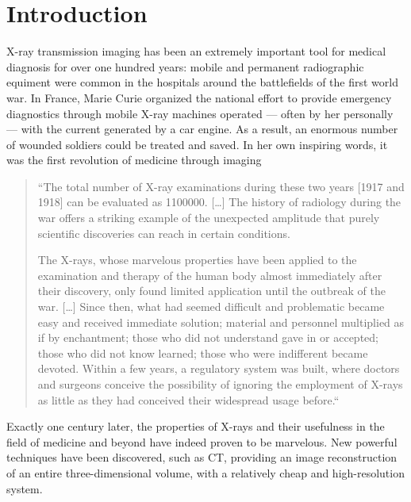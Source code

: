 \chapter{Introduction}\label{ch:introduction}
X-ray transmission imaging has been an extremely important tool for medical
diagnosis for over one hundred years: mobile and permanent radiographic
equiment were common in the hospitals around the battlefields of the first
world war. In France, Marie Curie organized the national effort to
provide emergency diagnostics through mobile X-ray machines operated ---
often by her personally --- with the current generated by a car engine. As a
result, an enormous number of wounded soldiers could be treated and saved.
In her own inspiring words, it was the first revolution of medicine through
imaging
\begin{quote}
    ``The total number of X-ray examinations during these two years [1917 and
    1918] can be evaluated as \num{1100000}. [\ldots]
    The history of radiology during the war offers a striking example of the
    unexpected amplitude that purely scientific discoveries can reach in
    certain conditions.

    The X-rays, whose marvelous properties have been applied to the
    examination and therapy of the human body almost immediately after their
    discovery, only found limited application until the outbreak of the war.
    [\ldots] Since then, what had seemed difficult and problematic became
    easy and received immediate solution; material and personnel
    multiplied as if by enchantment; those who did not understand gave in or
    accepted; those who did not know learned; those who were indifferent
    became devoted. Within a few years, a regulatory system was built, where
    doctors and surgeons conceive the possibility of ignoring the employment of
    X-rays as little as they had conceived their widespread usage
    before.``~\cite{Curie1921}
\end{quote}

Exactly one century later, the properties of X-rays and their usefulness in
the field of medicine and beyond have indeed proven to be marvelous. 
New powerful techniques have been discovered, such as \ac{CT}, providing an
image reconstruction of an entire three-dimensional volume, with a
relatively cheap and high-resolution system.

